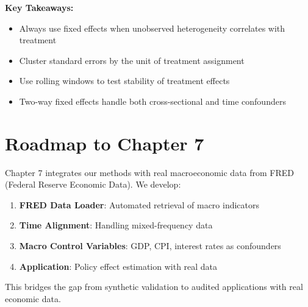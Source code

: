 \textbf{Key Takeaways:}
\begin{itemize}
    \item Always use fixed effects when unobserved heterogeneity correlates with treatment
    \item Cluster standard errors by the unit of treatment assignment
    \item Use rolling windows to test stability of treatment effects
    \item Two-way fixed effects handle both cross-sectional and time confounders
\end{itemize}

\section{Roadmap to Chapter 7}\label{sec:ch06_roadmap}

Chapter 7 integrates our methods with real macroeconomic data from FRED (Federal Reserve Economic Data). We develop:

\begin{enumerate}
    \item \textbf{FRED Data Loader}: Automated retrieval of macro indicators
    \item \textbf{Time Alignment}: Handling mixed-frequency data
    \item \textbf{Macro Control Variables}: GDP, CPI, interest rates as confounders
    \item \textbf{Application}: Policy effect estimation with real data
\end{enumerate}

This bridges the gap from synthetic validation to audited applications with real economic data.
